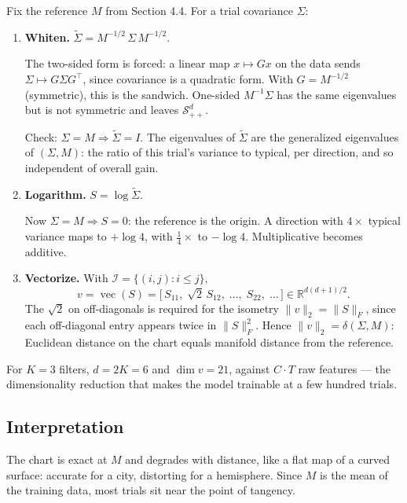 \documentclass[11pt]{article}
\newcommand{\Real}{\mathbb{R}}
\newcommand{\SPD}[1]{\mathcal{S}^{#1}_{++}}
\newcommand{\vect}{\operatorname{vec}}
\begin{document}
Fix the reference $M$ from Section 4.4. For a trial covariance $\Sigma$:

\begin{enumerate}[label=\textbf{\arabic*.},leftmargin=*]
\item \textbf{Whiten.}
$\tilde\Sigma = M^{-1/2}\, \Sigma\, M^{-1/2}$.

The two-sided form is forced: a linear map $x \mapsto Gx$ on the data
sends $\Sigma \mapsto G\Sigma G^\top$, since covariance is a quadratic
form. With $G = M^{-1/2}$ (symmetric), this is the sandwich. One-sided
$M^{-1}\Sigma$ has the same eigenvalues but is not symmetric and leaves
$\SPD{d}$.

Check: $\Sigma = M \Rightarrow \tilde\Sigma = I$. The eigenvalues of
$\tilde\Sigma$ are the generalized eigenvalues of $(\Sigma, M)$: the
ratio of this trial's variance to typical, per direction, and so
independent of overall gain.

\item \textbf{Logarithm.} $S = \log \tilde\Sigma$.

Now $\Sigma = M \Rightarrow S = 0$: the reference is the origin.
A direction with $4\times$ typical variance maps to $+\log 4$, with
$\tfrac{1}{4}\times$ to $-\log 4$. Multiplicative becomes additive.

\item \textbf{Vectorize.} With $\mathcal{I} = \{(i,j): i \le j\}$,
\[
v = \vect(S) = \big[\, S_{11},\; \sqrt{2}\,S_{12},\; \dots,\;
   S_{22},\; \dots \,\big] \in \Real^{d(d+1)/2}.
\]
The $\sqrt{2}$ on off-diagonals is required for the isometry
$\|v\|_2 = \|S\|_F$, since each off-diagonal entry appears twice in
$\|S\|_F^2$. Hence $\|v\|_2 = \delta(\Sigma, M)$: Euclidean distance on
the chart equals manifold distance from the reference.
\end{enumerate}

For $K=3$ filters, $d = 2K = 6$ and $\dim v = 21$, against $C \cdot T$
raw features --- the dimensionality reduction that makes the model
trainable at a few hundred trials.

\subsection{Interpretation}

The chart is exact at $M$ and degrades with distance, like a flat map
of a curved surface: accurate for a city, distorting for a hemisphere.
Since $M$ is the mean of the training data, most trials sit near the
point of tangency.
\end{document}
